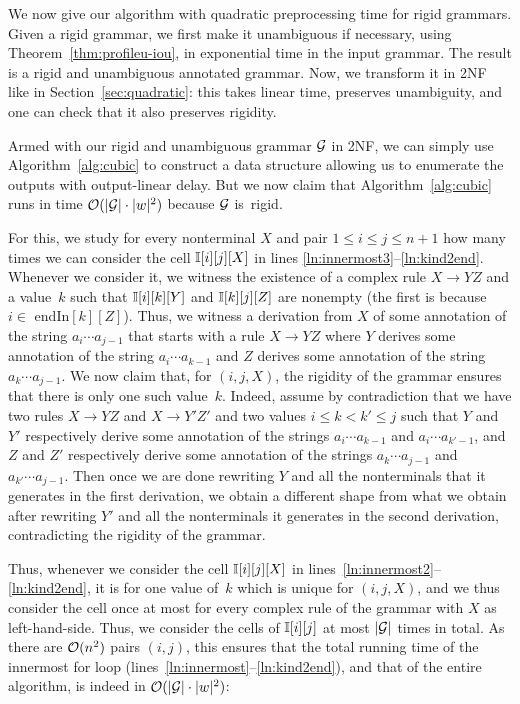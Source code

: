 %
%
%
%
%
%
%
%
%
%
%
%
%
%
%


%
%
We now give our algorithm with quadratic preprocessing time for
rigid grammars. Given a rigid grammar, we first make it unambiguous if
necessary, using Theorem~\ref{thm:profileu-iou}, in exponential time in the
input grammar. The result is a rigid and unambiguous annotated grammar. Now, we
transform it in 2NF like in Section~\ref{sec:quadratic}: this
takes linear time, preserves unambiguity, and one can check that it also
preserves rigidity.

Armed with our rigid and unambiguous grammar $\mathcal{G}$ in 2NF, we can simply use 
Algorithm~\ref{alg:cubic} to construct a data structure allowing us to enumerate
the outputs with output-linear delay. But we now claim that
Algorithm~\ref{alg:cubic} runs in time $\mathcal{O}(|\mathcal{G}| \cdot |w|^2)$ because $\mathcal{G}$
is~rigid.

For this, we study for every nonterminal $X$ and pair $1 \leq i \leq j \leq n+1$ how
many times we can consider the cell $\mathbb{I}[i][j][X]$ in lines
\ref{ln:innermost3}--\ref{ln:kind2end}. Whenever
we consider it, we witness the existence of a complex rule $X \rightarrow Y Z$
and a value~$k$ such that $\mathbb{I}[i][k][Y]$ and $\mathbb{I}[k][j][Z]$ are nonempty (the first
is because $i \in $ endIn$[k][Z]$). Thus, we witness a derivation from $X$ of
some annotation of the string $a_i \cdots a_{j-1}$ that starts with a rule $X
\rightarrow YZ$ where $Y$ derives some annotation of the string $a_i \cdots
a_{k-1}$ and $Z$ derives some annotation of the string $a_k \cdots a_{j-1}$. We
now claim that, for $(i, j, X)$, the rigidity of the grammar ensures that there is
only one such value~$k$. Indeed, assume by contradiction that we have two
rules $X \rightarrow YZ$ and $X \rightarrow Y'Z'$ and two values $i \leq k < k'
\leq j$ such that $Y$ and $Y'$ respectively derive some annotation of the
strings
$a_i \cdots a_{k-1}$ and $a_i \cdots a_{k'-1}$, and $Z$ and $Z'$ respectively
derive some annotation of the strings
$a_k \cdots a_{j-1}$ and $a_{k'} \cdots a_{j-1}$. Then once we are done
rewriting $Y$ and all the nonterminals that it generates in the first derivation, we
obtain a different shape from what we obtain after rewriting $Y'$ and all the
nonterminals it generates in the second derivation, contradicting the rigidity
of the grammar.

Thus, whenever we consider the cell $\mathbb{I}[i][j][X]$ in lines~\ref{ln:innermost2}--\ref{ln:kind2end}, it is
for one value of~$k$ which is unique for $(i,j,X)$, and we thus consider the
cell once
at most for every complex rule of the grammar with $X$ as left-hand-side. Thus,
we consider the cells of $\mathbb{I}[i][j]$ at most $|\mathcal{G}|$ times in total. As
there are $\mathcal{O}(n^2)$ pairs $(i,j)$, this ensures that the total running time of the
innermost for loop (lines~\ref{ln:innermost}--\ref{ln:kind2end}), and that of the entire algorithm, is indeed
in $\mathcal{O}(|\mathcal{G}| \cdot |w|^2)$:

